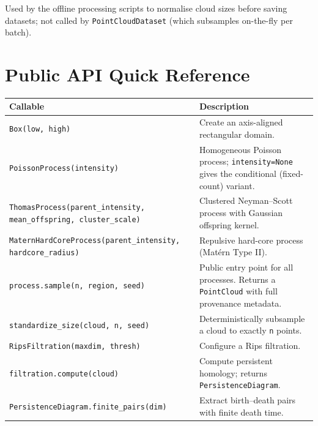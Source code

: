 \documentclass[11pt, a4paper]{article}
\newcommand{\code}[1]{\texttt{#1}}
\begin{document}
Used by the offline processing scripts to normalise cloud sizes before
saving datasets; not called by \code{PointCloudDataset} (which
subsamples on-the-fly per batch).

\section{Public API Quick Reference}
\label{sec:api}

\begin{longtable}{p{5.6cm} p{9.5cm}}
\toprule
\textbf{Callable} & \textbf{Description} \\
\midrule
\endhead
\bottomrule
\endfoot

\code{Box(low, high)} &
  Create an axis-aligned rectangular domain. \\[4pt]

\code{PoissonProcess(intensity)} &
  Homogeneous Poisson process; \code{intensity=None} gives the
  conditional (fixed-count) variant. \\[4pt]

\code{ThomasProcess(parent\_intensity,} \code{mean\_offspring, cluster\_scale)} &
  Clustered Neyman--Scott process with Gaussian offspring kernel. \\[4pt]

\code{MaternHardCoreProcess(parent\_intensity, hardcore\_radius)} &
  Repulsive hard-core process (Matérn Type II). \\[4pt]

\code{process.sample(n, region, seed)} &
  Public entry point for all processes.
  Returns a \code{PointCloud} with full provenance metadata. \\[4pt]

\code{standardize\_size(cloud, n, seed)} &
  Deterministically subsample a cloud to exactly \code{n} points. \\[4pt]

\code{RipsFiltration(maxdim, thresh)} &
  Configure a Rips filtration. \\[4pt]

\code{filtration.compute(cloud)} &
  Compute persistent homology; returns \code{PersistenceDiagram}. \\[4pt]

\code{PersistenceDiagram.finite\_pairs(dim)} &
  Extract birth--death pairs with finite death time. \\[4pt]


\end{longtable}
\end{document}
